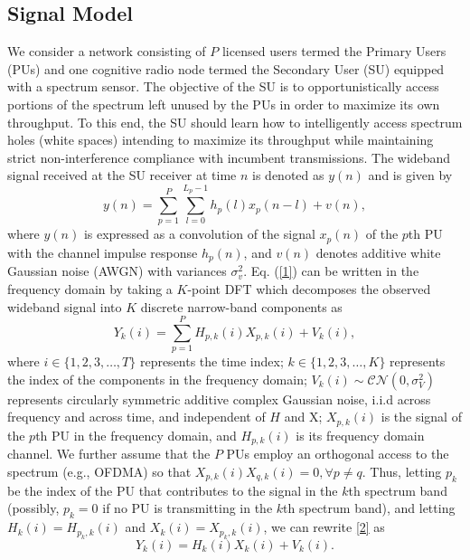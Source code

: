 \documentclass[10pt,twocolumn]{IEEEtran}
\begin{document}
\subsection{Signal Model}\label{A}
We consider a network consisting of $P$ licensed users termed the Primary Users (PUs) and one cognitive radio node termed the Secondary User (SU) equipped with a spectrum sensor. The objective of the SU is to opportunistically access portions of the spectrum left unused by the PUs in order to maximize its own throughput. To this end, the SU should learn how to intelligently access spectrum holes (white spaces) intending to maximize its throughput while maintaining strict non-interference compliance with incumbent transmissions.
The wideband signal received at the SU receiver at time $n$ is denoted as $y(n)$ and is given by 
\begin{equation}\label{1}
    y(n) = \sum_{p=1}^{P} \sum_{l=0}^{L_{p}-1} h_{p}(l)x_{p}(n-l) + v(n),
\end{equation}
where $y(n)$ is expressed as a convolution of the signal $x_{p}(n)$ of the $p$th PU with the channel impulse response $h_{p}(n)$, and $v(n)$ denotes additive white Gaussian noise (AWGN) with variances $\sigma_v^2$. Eq. (\ref{1}) can be written in the frequency domain by taking a $K$-point DFT which decomposes the observed wideband signal into $K$ discrete narrow-band components as 
\begin{equation}\label{2}
    Y_k(i) = \sum_{p=1}^{P} H_{p,k}(i)X_{p,k}(i) + V_k(i),
\end{equation}
where $i {\in} \{1,2,3,\dots,T\}$ represents the time index; $k {\in} \{1,2,3,\dots,K\}$ represents the index of the components in the frequency domain; $V_k(i) {\sim} \mathcal{CN}(0,\sigma_V^2)$ represents circularly symmetric additive complex Gaussian noise, i.i.d across frequency and across time, and independent of $H$ and X; $X_{p,k}(i)$ is the signal of the $p$th PU in the frequency domain, and $H_{p,k}(i)$ is its frequency domain channel. We further assume that the $P$ PUs employ an orthogonal access to the spectrum (e.g., OFDMA) so that $X_{p,k}(i)X_{q,k}(i)=0, \forall p\neq q$. Thus, letting $p_k$ be the index of the PU that contributes to the signal in the $k$th spectrum band (possibly, $p_k=0$ if no PU is transmitting in the $k$th spectrum band), and letting  $H_{k}(i)=H_{p_k,k}(i)$ and $X_{k}(i)=X_{p_k,k}(i)$, we can rewrite \eqref{2} as 
\begin{equation}\label{3}
    Y_k(i) = H_{k}(i)X_{k}(i) + V_k(i).
\end{equation}
\end{document}
